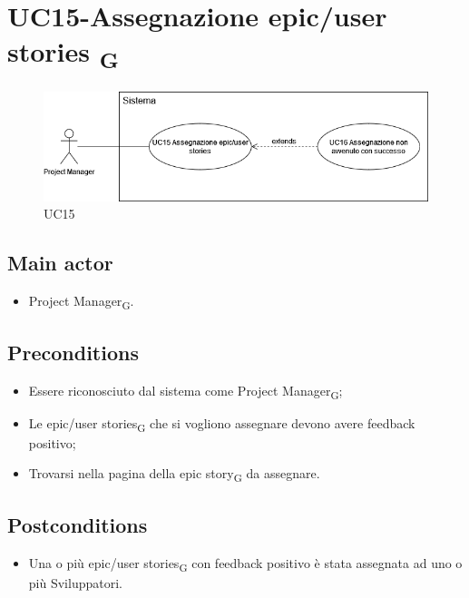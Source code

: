 \documentclass{article}
\begin{document}
\section{UC15-Assegnazione epic/user stories \textsubscript{G}}
    \begin{figure}[h]
      \centering
      \includegraphics[width=.8\textwidth, height=.6\textheight, keepaspectratio]{documenti/imgUML/UC15-ASSEGNAZIONE-EPIC-USER-STORIES.drawio.png}
    \caption{UC15}
      \label{fig:UC15}
    \end{figure}

    \subsection*{Main actor}
    \begin{itemize}
        \item Project Manager\textsubscript{G}.
    \end{itemize}
    
    \subsection*{Preconditions}
        \begin{itemize}
            \item Essere riconosciuto dal sistema come Project Manager\textsubscript{G};
            \item Le epic/user stories\textsubscript{G} che si vogliono assegnare devono avere feedback positivo;
            \item Trovarsi nella pagina della epic story\textsubscript{G} da assegnare.
        \end{itemize}
        
    \subsection*{Postconditions}
        \begin{itemize}
            \item Una o più epic/user stories\textsubscript{G} con feedback positivo è stata assegnata ad uno o più Sviluppatori.
        \end{itemize}
    
\end{document}
